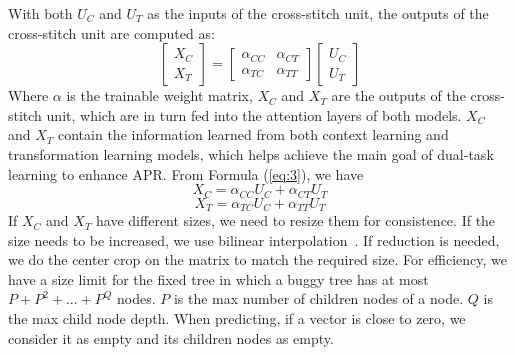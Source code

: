 With both $U_C$ and $U_T$ as the inputs of the cross-stitch unit, the
outputs of the cross-stitch unit are computed as:
\begin{equation}\label{eq:3}
	\begin{bmatrix}
		X_C\\
		X_T
	\end{bmatrix}
	=
	\begin{bmatrix}
		\alpha_{CC} &  \alpha_{CT} \\
		\alpha_{TC} &  \alpha_{TT}
	\end{bmatrix}
	\begin{bmatrix}
		U_C\\
		U_T
	\end{bmatrix}
\end{equation}
Where $\alpha$ is the trainable weight matrix, $X_C$ and $X_T$ are the
outputs of the cross-stitch unit, which are in turn fed into the
attention layers of both models. $X_C$ and $X_T$ contain the
information learned from both context learning and transformation
learning models, which helps achieve the main goal of dual-task learning
to enhance APR. From Formula (\ref{eq:3}), we have
\begin{equation}\label{eq:4}
	X_C = \alpha_{CC}U_C + \alpha_{CT}U_T
\end{equation}
\begin{equation}\label{eq:5}
	X_T = \alpha_{TC}U_C + \alpha_{TT}U_T
\end{equation}
If $X_C$ and $X_T$ have different sizes, we need to resize them
for consistence. If the size needs to be increased, we use bilinear
interpolation~\cite{bilinear-interpolation}. If reduction is needed,
we do the center crop on the matrix to match the required size. For
efficiency, we have a size limit for the fixed tree in which a
buggy tree has at most $P+P^2+...+P^Q$ nodes.  $P$ is the max number
of children nodes of a node. $Q$ is the max child node depth. When
predicting, if a vector is close to zero, we consider it as empty and
its children nodes as empty.


